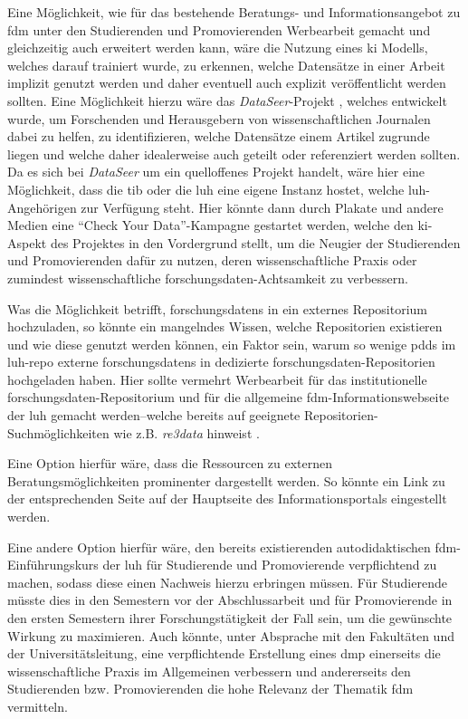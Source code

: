 Eine Möglichkeit, wie für das bestehende Beratungs- und Informationsangebot zu \gls{fdm} unter den Studierenden und Promovierenden Werbearbeit gemacht und gleichzeitig auch erweitert werden kann, wäre die Nutzung eines \gls{ki} Modells, welches darauf trainiert wurde, zu erkennen, welche Datensätze in einer Arbeit implizit genutzt werden und daher eventuell auch explizit veröffentlicht werden sollten.
Eine Möglichkeit hierzu wäre das \textit{DataSeer}-Projekt \autocite{dataseer}, welches entwickelt wurde, um Forschenden und Herausgebern von wissenschaftlichen Journalen dabei zu helfen, zu identifizieren, welche Datensätze einem Artikel zugrunde liegen und welche daher idealerweise auch geteilt oder referenziert werden sollten.
Da es sich bei \textit{DataSeer} um ein quelloffenes Projekt handelt, wäre hier eine Möglichkeit, dass die \gls{tib} oder die \gls{luh} eine eigene Instanz hostet, welche \gls{luh}-Angehörigen zur Verfügung steht.
Hier könnte dann durch Plakate und andere Medien eine \enquote{Check Your Data}-Kampagne gestartet werden, welche den \gls{ki}-Aspekt des Projektes in den Vordergrund stellt, um die Neugier der Studierenden und Promovierenden dafür zu nutzen, deren wissenschaftliche Praxis oder zumindest wissenschaftliche \gls{forschungsdaten}-Achtsamkeit zu verbessern.

Was die Möglichkeit betrifft, \glspl{forschungsdaten} in ein externes Repositorium hochzuladen, so könnte ein mangelndes Wissen, welche Repositorien existieren und wie diese genutzt werden können, ein Faktor sein, warum so wenige \glspl{pdd} im \gls{luh-repo} externe \glspl{forschungsdaten} in dedizierte \gls{forschungsdaten}-Repositorien hochgeladen haben.
Hier sollte vermehrt Werbearbeit für das institutionelle \gls{forschungsdaten}-Repositorium und für die allgemeine \gls{fdm}-Informationswebseite der \gls{luh} gemacht werden--welche bereits auf geeignete Repositorien-Suchmöglichkeiten wie z.B. \textit{re3data} hinweist \autocite{luhfdm-extern}.

Eine Option hierfür wäre, dass die Ressourcen zu externen Beratungsmöglichkeiten prominenter dargestellt werden.
So könnte ein Link zu der entsprechenden Seite auf der Hauptseite des Informationsportals eingestellt werden.
\pagebreak

Eine andere Option hierfür wäre, den bereits existierenden autodidaktischen \gls{fdm}-Einführungskurs der \gls{luh} für Studierende und Promovierende verpflichtend zu machen, sodass diese einen Nachweis hierzu erbringen müssen.
Für Studierende müsste dies in den Semestern vor der Abschlussarbeit und für Promovierende in den ersten Semestern ihrer Forschungstätigkeit der Fall sein, um die gewünschte Wirkung zu maximieren.
Auch könnte, unter Absprache mit den Fakultäten und der Universitätsleitung, eine verpflichtende Erstellung eines \gls{dmp} einerseits die wissenschaftliche Praxis im Allgemeinen verbessern und andererseits den Studierenden bzw. Promovierenden die hohe Relevanz der Thematik \gls{fdm} vermitteln.

